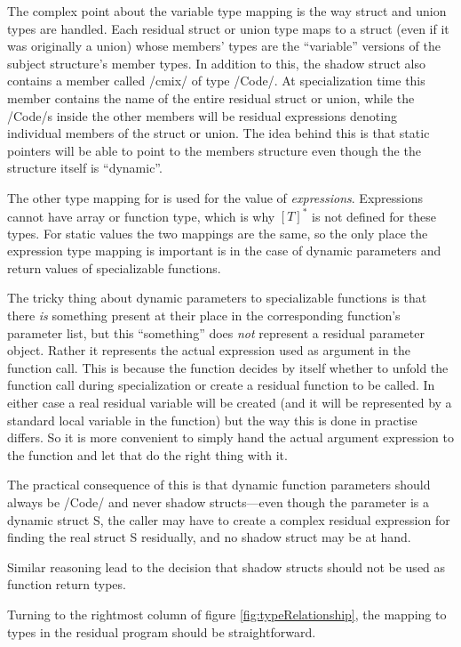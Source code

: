\begin{docpart}
The complex point about the variable type mapping is the way struct
and union types are handled. Each residual struct or union type maps
to a \Pgen struct (even if it was originally a union) whose members'
types are the ``variable'' versions of the subject structure's member
types. In addition to this, the shadow struct also contains a member
called /cmix/ of type /Code/. At specialization time this member
contains the name of the entire residual struct or union, while the
/Code/s inside the other members will be residual expressions denoting
individual members of the struct or union. The idea behind this is
that static pointers will be able to point to the members structure
even though the the structure itself is ``dynamic''.

The other type mapping for \Pgen is used for the value of \coreC
\emph{expressions}. Expressions cannot have array or function type,
which is why $[T]^*$ is not defined for these types. For static values
the two mappings are the same, so the only place the expression type
mapping is important is in the case of dynamic parameters and return
values of specializable functions.

The tricky thing about dynamic parameters to specializable functions
is that there \emph{is} something present at their place in the
corresponding \Pgen function's parameter list, but this ``something''
does \emph{not} represent a residual parameter object. Rather it
represents the actual expression used as argument in the function
call. This is because the \Pgen function decides by itself whether
to unfold the function call during specialization or create a residual
function to be called. In either case a real residual variable will
be created (and it will be represented by a standard local variable in
the \Pgen function) but the way this is done in practise differs.
So it is more convenient to simply hand the actual argument expression
to the \Pgen function and let that do the right thing with it.

The practical consequence of this is that dynamic function parameters
should always be /Code/ and never shadow structs---even though the
parameter is a dynamic struct S, the caller may have to create a
complex residual expression for finding the real struct S residually,
and no shadow struct may be at hand.

Similar reasoning lead to the decision that shadow structs should
not be used as function return types.

\smallskip

Turning to the rightmost column of figure \ref{fig:typeRelationship},
the mapping to types in the residual program should be
straightforward. 


\end{docpart}
